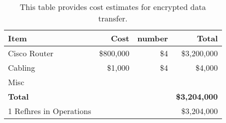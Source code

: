 \tiny \begin{longtable} {|l|r|r|r|} \caption{This table provides cost estimates for encrypted data transfer. \label{tab:ipsec}}\\ 
\hline 
\textbf{Item}&\textbf{Cost}&\textbf{number}&\textbf{Total} \\ \hline
{Cisco Router }&{\$800,000}&{\$4}&{\$3,200,000} \\ \hline
{Cabling}&{\$1,000}&{\$4}&{\$4,000} \\ \hline
{Misc}&&& \\ \hline
\textbf{Total}&\textbf{}&\textbf{}&\textbf{\$3,204,000} \\ \hline
{1 Refhres in Operations}&{}&{}&{\$3,204,000} \\ \hline
\end{longtable} \normalsize
